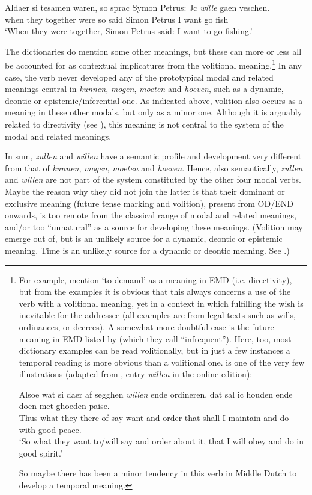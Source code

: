\documentclass[output=paper]{langsci/langscibook}
\begin{document}
\ea%
    \label{ex:nuyts:18}
\gll           Aldaer si tesamen waren, so sprac Symon Petrus: Jc \textit{wille} gaen veschen.\\
  when they together were so said Simon Petrus I want go fish\\
\glt   `When they were together, Simon Petrus said: I want to go fishing.'
\z

\noindent The dictionaries do mention some other meanings, but these can more or less all be accounted for as contextual implicatures from the volitional meaning.\footnote{For example, \citet{PijnenburgEtAl2000} mention ‘to demand’ as a meaning in EMD (i.e. directivity), but from the examples it is obvious that this always concerns a use of the verb with a volitional meaning, yet in a context in which fulfilling the wish is inevitable for the addressee (all examples are from legal texts such as wills, ordinances, or decrees). A somewhat more doubtful case is the future meaning in EMD listed by \citet{PijnenburgEtAl2000} (which they call “infrequent”). Here, too, most dictionary examples can be read volitionally, but in just a few instances a temporal reading is more obvious than a volitional one.  is one of the very few illustrations (adapted from \citealt{PijnenburgEtAl2000}, entry \textit{willen} in the online edition): 

\ea 
    \label{ex:nuyts:fn}
\gll Alsoe wat si daer af segghen \textit{willen} ende ordineren, dat sal ic houden ende doen met ghoeden paise.\\
Thus what they there of say want and order that shall I maintain and do with good peace.\\
\glt `So what they want to/will say and order about it, that I will obey and do in good spirit.'
\z

\noindent So maybe there has been a minor tendency in this verb in Middle Dutch to develop a temporal meaning.} In any case, the verb never developed any of the prototypical modal and related meanings central in \textit{kunnen}, \textit{mogen}, \textit{moeten} and \textit{hoeven}, such as a dynamic, deontic or epistemic/inferential one. As indicated above, volition also occurs as a meaning in these other modals, but only as a minor one. Although it is arguably related to directivity (see \citealt{Nuyts2008}), this meaning is not central to the system of the modal and related meanings.

In sum, \textit{zullen} and \textit{willen} have a semantic profile and development very different from that of \textit{kunnen}, \textit{mogen}, \textit{moeten} and \textit{hoeven}. Hence, also semantically, \textit{zullen} and \textit{willen} are not part of the system constituted by the other four modal verbs. Maybe the reason why they did not join the latter is that their dominant or exclusive meaning (future tense marking and volition), present from OD/END onwards, is too remote from the classical range of modal and related meanings, and/or too “unnatural” as a source for developing these meanings. (Volition may emerge out of, but is an unlikely source for a dynamic, deontic or epistemic meaning. Time is an unlikely source for a dynamic or deontic meaning. See \citealt{BylooNuyts2014}.)
\end{document}
